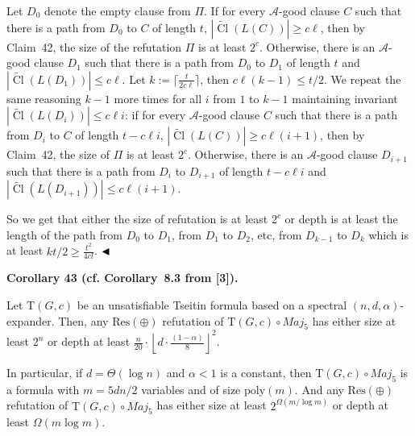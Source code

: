 \documentclass[10pt,a4paper]{article}
\begin{document}
Let $D_{0}$ denote the empty clause from $\Pi$. If for every $\mathcal{A}$-good clause $C$ such that there is a path from $D_{0}$ to $C$ of length $t$, $|\widetilde{\mathop{\mathrm{Cl}}}(L(C))|\geq c\ell$, then by Claim 42, the size of the refutation $\Pi$ is at least $2^{c}$. Otherwise, there is an $\mathcal{A}$-good clause $D_{1}$ such that there is a path from $D_{0}$ to $D_{1}$ of length $t$ and $|\widetilde{\mathop{\mathrm{Cl}}}(L(D_{1}))|\leq c\ell$. Let $k:=\lceil\frac{t}{2c\ell}\rceil$, then $c\ell(k-1)\leq t/2$. We repeat the same reasoning $k-1$ more times for all $i$ from $1$ to $k-1$ maintaining invariant $|\widetilde{\mathop{\mathrm{Cl}}}(L(D_{i}))|\leq c\ell i$:
if for every $\mathcal{A}$-good clause $C$ such that there is a path from $D_{i}$ to $C$ of length $t-c\ell i$, $|\widetilde{\mathop{\mathrm{Cl}}}(L(C))|\geq c\ell(i+1)$, then by Claim 42, the size of $\Pi$ is at least $2^{c}$. Otherwise, there is an $\mathcal{A}$-good clause $D_{i+1}$ such that there is a path from $D_{i}$ to $D_{i+1}$ of length $t-c\ell i$ and $|\widetilde{\mathop{\mathrm{Cl}}}(L(D_{i+1}))|\leq c\ell(i+1)$.\par



So we get that either the size of refutation is at least $2^{c}$ or depth is at least the length of the path from $D_{0}$ to $D_{1}$, from $D_{1}$ to $D_{2}$, etc, from $D_{k-1}$ to $D_{k}$ which is at least $kt/2\geq\frac{t^{2}}{4cl}$.
$\hfill\blacktriangleleft$\par



\par\medskip\noindent\textbf{
Corollary 43 (cf. Corollary 8.3 from [3]).
}\par



Let $\mathrm{T}(G,c)$ be an unsatisfiable Tseitin formula based on a spectral $(n,d,\alpha)$-expander. Then, any $\mathrm{Res}(\oplus)$ refutation of $\mathrm{T}(G,c)\circ Maj_{5}$ has either size at least $2^{n}$ or depth at least $\frac{n}{20}\cdot\left\lfloor d\cdot\frac{(1-\alpha)}{8}\right\rfloor^{2}$.\par




In particular, if $d=\Theta(\log n)$ and $\alpha<1$ is a constant, then $\mathrm{T}(G,c)\circ Maj_{5}$ is a formula with $m=5dn/2$ variables and of size $\mathrm{poly}(m)$. And any $\mathrm{Res}(\oplus)$ refutation of $\mathrm{T}(G,c)\circ Maj_{5}$ has either size at least $2^{\Omega(m/\log m)}$ or depth at least $\Omega(m\log m)$.\par
\end{document}
